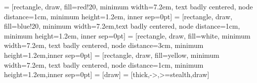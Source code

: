 
 = [rectangle, draw, fill=red!20, 
minimum width=7.2em, text badly centered, node distance=1cm, minimum height=1.2em, inner sep=0pt]
 = [rectangle, draw, fill=blue!20, 
minimum width=7.2em,text badly centered, node distance=1cm, minimum height=1.2em, inner sep=0pt]
 = [rectangle, draw, fill=white, 
minimum width=7.2em, text badly centered, node distance=3cm, minimum height=1.2em,inner sep=0pt]
 = [rectangle, draw, fill=yellow, 
minimum width=7.2em, text badly centered, node distance=1cm, minimum height=1.2em,inner sep=0pt]
 = [draw]
 = [thick,->,>=stealth,draw]

